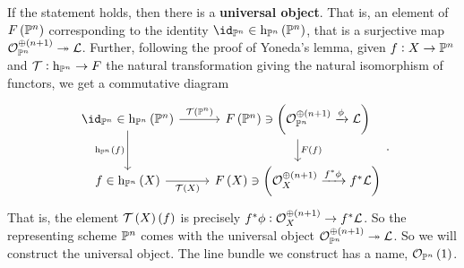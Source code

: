 If the statement holds, then there is a \textbf{universal object}. That is, an element of $ F\br{\PP^n} $ corresponding to the identity $ \id_{\PP^n} \in \h_{\PP^n}\br{\PP^n} $, that is a surjective map $ \OOO_{\PP^n}^{\oplus \br{n + 1}} \twoheadrightarrow \LLL $. Further, following the proof of Yoneda's lemma, given $ f : X \to \mathbb{P}^n $ and $ \mathcal{T} : \mathrm{h}_{\mathbb{P}^n} \to F $ the natural transformation giving the natural isomorphism of functors, we get a commutative diagram
$$
\begin{tikzcd}
\id_{\PP^n} \in \h_{\PP^n}\br{\PP^n} \arrow{r}{\TTT\br{\PP^n}} \arrow{d}[swap]{\h_{\PP^n}\br{f}} & F\br{\PP^n} \ni \br{\OOO_{\PP^n}^{\oplus \br{n + 1}} \xrightarrow{\phi} \LLL} \arrow{d}{F\br{f}} \\
f \in \h_{\PP^n}\br{X} \arrow{r}[swap]{\TTT\br{X}} & F\br{X} \ni \br{\OOO_X^{\oplus \br{n + 1}} \xrightarrow{f^*\phi} f^*\LLL}
\end{tikzcd}.
$$
That is, the element $ \TTT\br{X}\br{f} $ is precisely $ f^*\phi : \OOO_X^{\oplus \br{n + 1}} \to f^*\LLL $. So the representing scheme $ \mathbb{P}^n $ comes with the universal object $ \OOO_{\PP^n}^{\oplus \br{n + 1}} \twoheadrightarrow \LLL $. So we will construct the universal object. The line bundle we construct has a name, $ \OOO_{\PP^n}\br{1} $.
